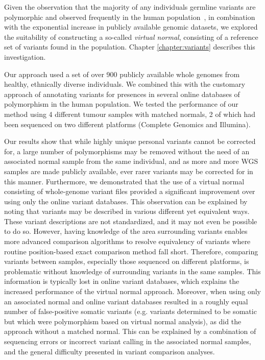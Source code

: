 Given the observation that the majority of any individuals germline variants are polymorphic and observed frequently in the human population~\cite{TODO}, in combination with the exponential increase in publicly available genomic datasets, we explored the suitability of constructing a so-called \emph{virtual normal}, consisting of a reference set of variants found in the population. Chapter \ref{chapter:variants} describes this investigation.

Our approach used a set of over 900 publicly available whole genomes from healthy, ethnically diverse individuals. We combined this with the customary approach of annotating variants for presences in several online databases of polymorphism in the human population. We tested the performance of our method using 4 different tumour samples with matched normals, 2 of which had been sequenced on two different platforms (Complete Genomics and Illumina).

Our results show that while highly unique personal variants cannot be corrected for, a large number of polymorphisms may be removed without the need of an associated normal sample from the same individual, and as more and more WGS samples are made publicly available, ever rarer variants may be corrected for in this manner. Furthermore, we demonstrated that the use of a virtual normal consisting of whole-genome variant files provided a significant improvement over using only the online variant databases. This observation can be explained by noting that variants may be described in various different yet equivalent ways. These variant descriptions are not standardized, and it may not even be possible to do so. However, having knowledge of the area surrounding variants enables more advanced comparison algorithms to resolve equivalency of variants where routine position-based exact comparison method fall short. Therefore, comparing variants between samples, especially those sequenced on different platforms, is problematic without knowledge of surrounding variants in the same samples. This information is typically lost in online variant databases, which explains the increased performance of the virtual normal approach. Moreover, when using only an associated normal and online variant databases resulted in a roughly equal number of false-positive somatic variants (e.g. variants determined to be somatic but which were polymorphism based on virtual normal analysis), as did the approach without a matched normal. This can be explained by a combination of sequencing errors or incorrect variant calling in the associated normal samples, and the general difficulty presented in variant comparison analyses.

